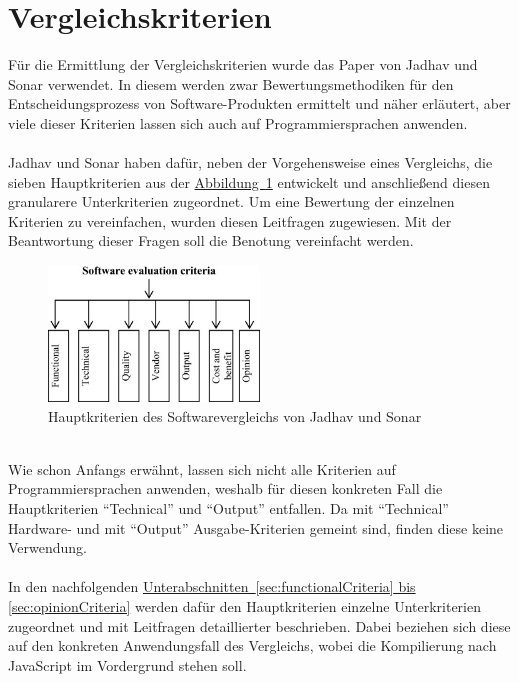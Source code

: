 \section{Vergleichskriterien}\label{sec:comparisonCriteria}
Für die Ermittlung der Vergleichskriterien wurde das Paper \cite{frameworkEvaluation} von Jadhav und Sonar verwendet. In diesem werden zwar Bewertungsmethodiken für den Entscheidungsprozess von Software-Produkten ermittelt und näher erläutert, aber viele dieser Kriterien lassen sich auch auf Programmiersprachen anwenden. \\
\\
Jadhav und Sonar haben dafür, neben der Vorgehensweise eines Vergleichs, die sieben Hauptkriterien aus der \hyperref[fig:comparisionCriteria]{Abbildung~\ref{fig:comparisionCriteria}} entwickelt und anschließend diesen granularere Unterkriterien zugeordnet. Um eine Bewertung der einzelnen Kriterien zu vereinfachen, wurden diesen Leitfragen zugewiesen. Mit der Beantwortung dieser Fragen soll die Benotung vereinfacht werden.\\
\begin{figure}[htb]
	\includegraphics[width=0.5\textwidth]{images/comparision-criteria.jpg}
	\caption{Hauptkriterien des Softwarevergleichs von Jadhav und Sonar \cite{frameworkEvaluation}}
	\label{fig:comparisionCriteria}
\end{figure}
\\
Wie schon Anfangs erwähnt, lassen sich nicht alle Kriterien auf Programmiersprachen anwenden, weshalb für diesen konkreten Fall die Hauptkriterien \enquote{Technical} und \enquote{Output} entfallen. Da mit \enquote{Technical} Hardware- und mit \enquote{Output} Ausgabe-Kriterien gemeint sind, finden diese keine Verwendung.\\
\\
In den nachfolgenden \hyperref[sec:functionalCriteria, sec:opinionCriteria]{Unterabschnitten~\ref{sec:functionalCriteria} bis \ref{sec:opinionCriteria}} werden dafür den Hauptkriterien einzelne Unterkriterien zugeordnet und mit Leitfragen detaillierter beschrieben. Dabei beziehen sich diese auf den konkreten Anwendungsfall des Vergleichs, wobei die Kompilierung nach JavaScript im Vordergrund stehen soll.
 
